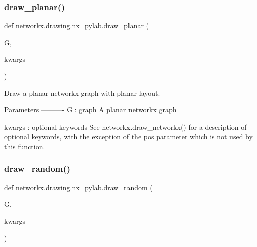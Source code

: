  \mbox{\label{namespacenetworkx_1_1drawing_1_1nx__pylab_a1a77ee04f7a8a5b04de461332027abd7}} 
\subsubsection{\texorpdfstring{draw\+\_\+planar()}{draw\_planar()}}
{\footnotesize\ttfamily def networkx.\+drawing.\+nx\+\_\+pylab.\+draw\+\_\+planar (\begin{DoxyParamCaption}\item[{}]{G,  }\item[{}]{kwargs }\end{DoxyParamCaption})}

\begin{DoxyVerb}Draw a planar networkx graph with planar layout.

Parameters
----------
G : graph
    A planar networkx graph

kwargs : optional keywords
    See networkx.draw_networkx() for a description of optional keywords,
    with the exception of the pos parameter which is not used by this
    function.
\end{DoxyVerb}
 \mbox{\label{namespacenetworkx_1_1drawing_1_1nx__pylab_ae8ec30406a42f7c3296ffca2260dce69}} 
\subsubsection{\texorpdfstring{draw\+\_\+random()}{draw\_random()}}
{\footnotesize\ttfamily def networkx.\+drawing.\+nx\+\_\+pylab.\+draw\+\_\+random (\begin{DoxyParamCaption}\item[{}]{G,  }\item[{}]{kwargs }\end{DoxyParamCaption})}

